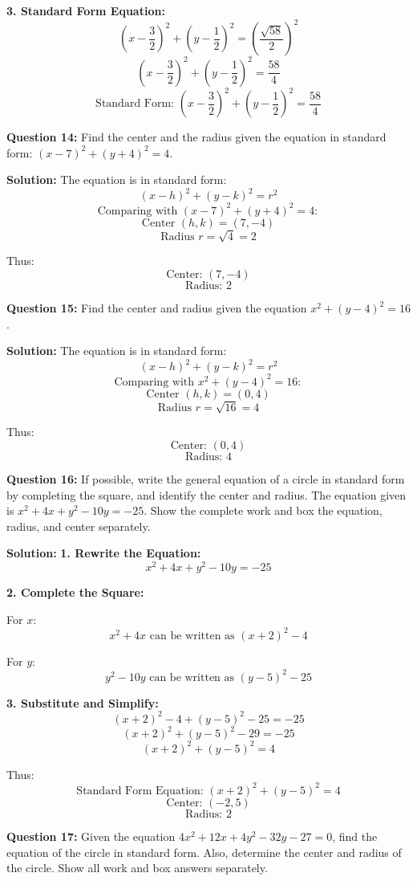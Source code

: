 \documentclass{article}
\begin{document}
\textbf{3. Standard Form Equation:}
\[
\left(x - \frac{3}{2}\right)^2 + \left(y - \frac{1}{2}\right)^2 = \left(\frac{\sqrt{58}}{2}\right)^2
\]
\[
\left(x - \frac{3}{2}\right)^2 + \left(y - \frac{1}{2}\right)^2 = \frac{58}{4}
\]
\[
\text{Standard Form: } \boxed{\left(x - \frac{3}{2}\right)^2 + \left(y - \frac{1}{2}\right)^2 = \frac{58}{4}}
\]

\textbf{Question 14:} Find the center and the radius given the equation in standard form: \((x-7)^2 + (y + 4)^2 = 4\).

\textbf{Solution:}
The equation is in standard form:
\[
(x - h)^2 + (y - k)^2 = r^2
\]
\[
\text{Comparing with } (x-7)^2 + (y + 4)^2 = 4:
\]
\[
\text{Center } (h, k) = (7, -4)
\]
\[
\text{Radius } r = \sqrt{4} = 2
\]

Thus:
\[
\text{Center: } \boxed{(7, -4)}
\]
\[
\text{Radius: } \boxed{2}
\]

\textbf{Question 15:} Find the center and radius given the equation \(x^2 + (y-4)^2 = 16\).

\textbf{Solution:}
The equation is in standard form:
\[
(x - h)^2 + (y - k)^2 = r^2
\]
\[
\text{Comparing with } x^2 + (y-4)^2 = 16:
\]
\[
\text{Center } (h, k) = (0, 4)
\]
\[
\text{Radius } r = \sqrt{16} = 4
\]

Thus:
\[
\text{Center: } \boxed{(0, 4)}
\]
\[
\text{Radius: } \boxed{4}
\]

\textbf{Question 16:} If possible, write the general equation of a circle in standard form by completing the square, and identify the center and radius. The equation given is \(x^2 + 4x + y^2 - 10y = -25\). Show the complete work and box the equation, radius, and center separately.

\textbf{Solution:}
\textbf{1. Rewrite the Equation:}
\[
x^2 + 4x + y^2 - 10y = -25
\]

\textbf{2. Complete the Square:}

For \(x\):
\[
x^2 + 4x \text{ can be written as } (x + 2)^2 - 4
\]

For \(y\):
\[
y^2 - 10y \text{ can be written as } (y - 5)^2 - 25
\]

\textbf{3. Substitute and Simplify:}
\[
(x + 2)^2 - 4 + (y - 5)^2 - 25 = -25
\]
\[
(x + 2)^2 + (y - 5)^2 - 29 = -25
\]
\[
(x + 2)^2 + (y - 5)^2 = 4
\]

Thus:
\[
\text{Standard Form Equation: } \boxed{(x + 2)^2 + (y - 5)^2 = 4}
\]
\[
\text{Center: } \boxed{(-2, 5)}
\]
\[
\text{Radius: } \boxed{2}
\]

\textbf{Question 17:} Given the equation \(4x^2 + 12x + 4y^2 - 32y - 27 = 0\), find the equation of the circle in standard form. Also, determine the center and radius of the circle. Show all work and box answers separately.
\end{document}
